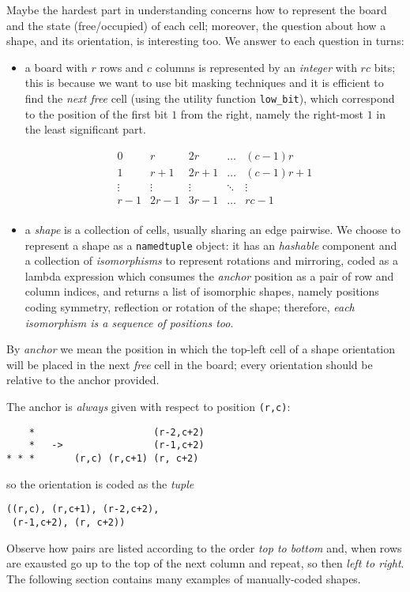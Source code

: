Maybe the hardest part in understanding concerns how to represent the board and
the state (free/occupied) of each cell; moreover, the question about how a
shape, and its orientation, is interesting too. We answer to each question in
turns:
\begin{itemize}
    \item a board with $r$ rows and $c$ columns is represented by an
    \textit{integer} with $rc$ bits; this is because we want to use bit masking
    techniques and it is efficient to find the \textit{next free} cell (using
    the utility function \verb|low_bit|), which correspond to the position of
    the first bit $1$ from the right, namely the right-most $1$ in the least
    significant part.
    \begin{margintable}[-2cm]
        \begin{displaymath}
        \begin{array}{c|c|c|c|c}
        0 & r & 2r & \ldots & (c-1)r \\
        \hline
        1 & r+1 & 2r+1 & \ldots & (c-1)r+1 \\
        \hline
        \vdots & \vdots & \vdots & \ddots & \vdots \\
        \hline
        r-1 & 2r-1 & 3r-1 & \ldots & rc-1\\
        \end{array}
        \end{displaymath}
    \end{margintable}

    \item a \textit{shape} is a collection of cells, usually sharing an edge
    pairwise. We choose to represent a shape as a \verb|namedtuple| object: it
    has an \textit{hashable} component and a collection of
    \textit{isomorphisms} to represent rotations and mirroring, coded as a
    lambda expression which consumes the \textit{anchor} position as a pair of row
    and column indices, and returns a list of isomorphic shapes, namely
    positions coding symmetry, reflection or rotation of the shape; therefore,
    \textit{each isomorphism is a sequence of positions too}.
\end{itemize}
By \textit{anchor} we mean the position in which the top-left cell of a shape
orientation will be placed in the next \textit{free} cell in the board; every
orientation should be relative to the anchor provided.
\begin{margintable}
The anchor is \textit{always} given with respect to position \verb|(r,c)|:
\begin{verbatim}
    *                     (r-2,c+2)
    *   ->                (r-1,c+2)
* * *       (r,c) (r,c+1) (r, c+2)
\end{verbatim}
so the orientation is coded as the \textit{tuple}
\begin{verbatim}
((r,c), (r,c+1), (r-2,c+2),
 (r-1,c+2), (r, c+2))
\end{verbatim}
\end{margintable}
Observe how pairs are listed according to the order \textit{top to bottom} and,
when rows are exausted go up to the top of the next column and repeat, so then
\textit{left to right}.  The following section contains many examples of
manually-coded shapes.


